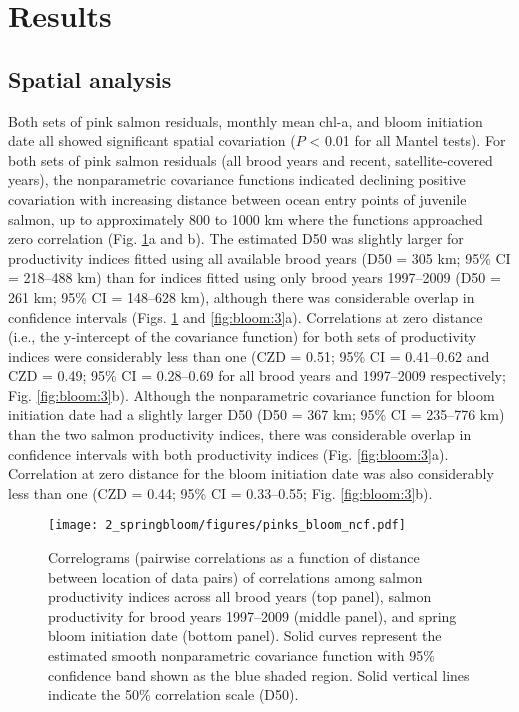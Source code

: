 \section{Results}

\subsection{Spatial analysis}

Both sets of pink salmon residuals, monthly mean chl-a, and bloom initiation
date all showed significant spatial covariation ($P$ \textless{} 0.01 for all
Mantel tests). For both sets of pink salmon residuals (all brood years and
recent, satellite-covered years), the nonparametric covariance functions
indicated declining positive covariation with increasing distance between ocean
entry points of juvenile salmon, up to approximately 800 to 1000 km where the
functions approached zero correlation (Fig. \ref{fig:bloom:2}a and b). The
estimated D50 was slightly larger for productivity indices fitted using all
available brood years (D50 = 305 km; 95\% CI = 218--488 km) than for indices
fitted using only brood years 1997--2009 (D50 = 261 km; 95\% CI = 148--628 km),
although there was considerable overlap in confidence intervals (Figs.
\ref{fig:bloom:2} and \ref{fig:bloom:3}a). Correlations at zero distance (i.e.,
the y-intercept of the covariance function) for both sets of productivity
indices were considerably less than one (CZD = 0.51; 95\% CI = 0.41--0.62 and CZD
= 0.49; 95\% CI = 0.28--0.69 for all brood years and 1997--2009 respectively; Fig.
\ref{fig:bloom:3}b). Although the nonparametric covariance function for bloom
initiation date had a slightly larger D50 (D50 = 367 km; 95\% CI = 235--776 km)
than the two salmon productivity indices, there was considerable overlap in
confidence intervals with both productivity indices (Fig. \ref{fig:bloom:3}a).
Correlation at zero distance for the bloom initiation date was also considerably
less than one (CZD = 0.44; 95\% CI = 0.33--0.55; Fig. \ref{fig:bloom:3}b).

\begin{figure}[htbp]
  \centering \texttt{[image: 2\_springbloom/figures/pinks\_bloom\_ncf.pdf]}
  \caption[Correlograms of correlations among salmon productivity
           indices and spring bloom initiation date]{Correlograms (pairwise
           correlations as a function of distance between location of data
           pairs) of correlations among salmon productivity indices across all
           brood years (top panel), salmon productivity for brood years
           1997--2009 (middle panel), and spring bloom initiation date (bottom
           panel). Solid curves represent the estimated smooth nonparametric
           covariance function with 95\% confidence band shown as the blue
           shaded region. Solid vertical lines indicate the 50\% correlation
           scale (D50).}
  \label{fig:bloom:2}
\end{figure}

